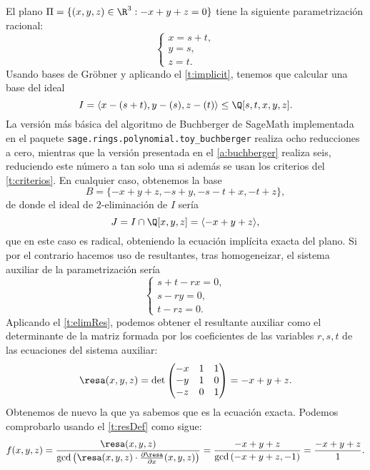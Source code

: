 \begin{ejemplo}\label{ej:finalGroebner}
    El plano $\Pi = \{(x,y,z) \in \R^3 : -x+y+z=0\}$ tiene la siguiente parametrización racional:
    \begin{equation*}
        \begin{cases}
        x = s+t,\\
        y = s,\\
        z = t.
    \end{cases}
    \end{equation*}
    Usando bases de Gröbner y aplicando el \autoref{t:implicit}, tenemos que calcular una base del ideal
    \begin{equation*}
        I = \langle x-(s+t), y - (s), z-(t) \rangle \le \Q[s,t,x,y,z].
    \end{equation*}
    La versión más básica del algoritmo de Buchberger de SageMath implementada en el paquete \texttt{sage.rings.polynomial.toy\_buchberger} realiza ocho reducciones a cero, mientras que la versión presentada en el \autoref{a:buchberger} realiza seis, reduciendo este número a tan solo una si además se usan los criterios del \autoref{t:criterios}. En cualquier caso, obtenemos la base
    \begin{equation*}
        B= \{-x + y + z, -s + y, -s - t + x, -t + z\},
    \end{equation*}
    de donde el ideal de $2$-eliminación de $I$ sería
    \begin{equation*}
        J = I \cap \Q[x,y,z] = \langle -x + y + z  \rangle,
    \end{equation*}
    que en este caso es radical, obteniendo la ecuación implícita exacta del plano.\newline
    Si por el contrario hacemos uso de resultantes, tras homogeneizar, el sistema auxiliar de la parametrización sería
    \begin{equation*}
        \begin{cases}
            s+t-rx=0,\\
            s-ry=0,\\
            t-rz=0.
        \end{cases}
    \end{equation*}
    Aplicando el \autoref{t:elimRes}, podemos obtener el resultante auxiliar como el determinante de la matriz formada por los coeficientes de las variables $r,s,t$ de las ecuaciones del sistema auxiliar:
    \begin{equation*}
        \resa(x,y,z) = \det\begin{pmatrix} -x & 1 & 1\\ -y&1&0\\ -z&0&1 \end{pmatrix} = -x+y+z.
    \end{equation*}
    Obtenemos de nuevo la que ya sabemos que es la ecuación exacta. Podemos comprobarlo usando el \autoref{t:resDef} como sigue:
    \begin{equation*}
        f(x,y,z) = \frac{\resa(x,y,z)}{\gcd\left( \resa(x,y,z)\cdot \frac{\partial \resa}{\partial x}(x,y,z)  \right)} = \frac{-x+y+z}{\gcd\left( -x+y+z, -1  \right)} = \frac{-x+y+z}{1}.
    \end{equation*}
\end{ejemplo}
